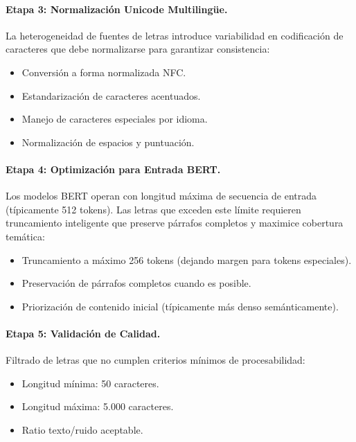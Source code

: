 \paragraph{Etapa 3: Normalización Unicode Multilingüe.}
La heterogeneidad de fuentes de letras introduce variabilidad en codificación de caracteres que debe normalizarse para garantizar consistencia:
\begin{itemize}
    \item Conversión a forma normalizada NFC.
    \item Estandarización de caracteres acentuados.
    \item Manejo de caracteres especiales por idioma.
    \item Normalización de espacios y puntuación.
\end{itemize}

\paragraph{Etapa 4: Optimización para Entrada BERT.}
Los modelos BERT operan con longitud máxima de secuencia de entrada (típicamente 512 tokens). Las letras que exceden este límite requieren truncamiento inteligente que preserve párrafos completos y maximice cobertura temática:
\begin{itemize}
    \item Truncamiento a máximo 256 tokens (dejando margen para tokens especiales).
    \item Preservación de párrafos completos cuando es posible.
    \item Priorización de contenido inicial (típicamente más denso semánticamente).
\end{itemize}

\paragraph{Etapa 5: Validación de Calidad.}
Filtrado de letras que no cumplen criterios mínimos de procesabilidad:
\begin{itemize}
    \item Longitud mínima: 50 caracteres.
    \item Longitud máxima: 5.000 caracteres.
    \item Ratio texto/ruido aceptable.
\end{itemize}

